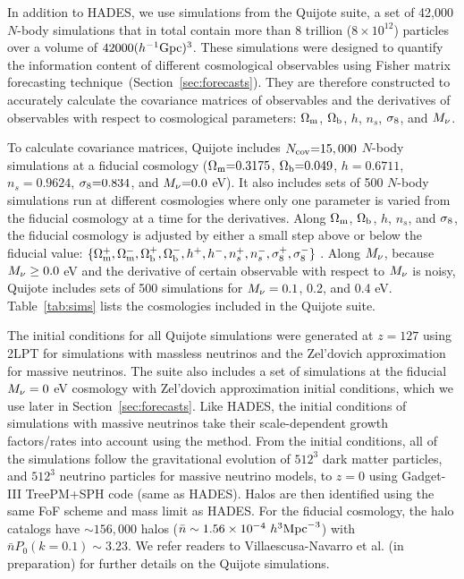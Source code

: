 In addition to HADES, we use simulations from the Quijote suite, a
set of 42,000 $N$-body simulations that in total contain more than 8 trillion 
($8\times10^{12}$) particles over a volume of $42000 (h^{-1}{\rm Gpc})^3$. 
These simulations were designed to quantify the information content of 
different cosmological observables using Fisher matrix forecasting 
technique~(Section~\ref{sec:forecasts}). They are therefore constructed to accurately 
calculate the covariance matrices of observables and the derivatives of observables with 
respect to cosmological parameters: 
$\Omega_{\rm m}$, $\Omega_{\rm b}$, $h$, $n_s$, $\sigma_8$, and $M_\nu$.

To calculate covariance matrices, Quijote includes $N_{\rm cov}{=}15,000$ $N$-body 
simulations at a fiducial cosmology ($\Omega_{\rm m}{=}0.3175$, $\Omega_{\rm b}{=}0.049$, $h{=}0.6711$, 
$n_s{=}0.9624$, $\sigma_8{=}0.834$, and $M_\nu{=}0.0$ eV). It also includes sets 
of 500 $N$-body simulations run at different cosmologies where only one parameter 
is varied from the fiducial cosmology at a time for the derivatives. Along $\Omega_{\rm m}$, 
$\Omega_{\rm b}$, $h$, $n_s$, and $\sigma_8$, the fiducial cosmology is adjusted by either a 
small step above or below the fiducial value: 
$\{\Omega_{\rm m}^{+}, \Omega_{\rm m}^{-}, \Omega_{\rm b}^{+}, \Omega_{\rm b}^{-}, h^+, h^-, n_s^{+}, n_s^{-}, \sigma_8^{+}, \sigma_8^-\}$ . 
Along $M_\nu$, because $M_\nu \ge 0.0$ eV and the derivative of certain observable 
with respect to $M_\nu$ is noisy, Quijote includes sets of 500 simulations for 
$M_\nu = 0.1$, 0.2, and 0.4 eV. Table~\ref{tab:sims} lists the cosmologies included 
in the Quijote suite. 

The initial conditions for all Quijote simulations were generated at $z=127$ using 
2LPT for simulations with massless neutrinos and the Zel’dovich approximation for 
massive neutrinos. The suite also includes a set of simulations at the fiducial 
$M_\nu = 0$ eV cosmology with Zel'dovich approximation initial conditions, which 
we use later in Section~\ref{sec:forecasts}. Like HADES, the initial conditions 
of simulations with massive neutrinos take their scale-dependent growth factors/rates 
into account using the \cite{zennaro2017a} method. From the initial conditions, all 
of the simulations follow the gravitational evolution of $512^3$ dark matter particles, 
and $512^3$ neutrino particles for massive neutrino models, to $z=0$ using {\sc Gadget-III}
TreePM+SPH code (same as HADES). Halos are then identified using the same FoF 
scheme and mass limit as HADES. For the fiducial cosmology, the halo catalogs 
have ${\sim}156,000$ halos ($\bar{n} \sim 1.56 \times 10^{-4}~h^3{\rm Mpc}^{-3}$) 
with $\bar{n} P_0(k=0.1)\sim 3.23$.
We refer readers to Villaescusa-Navarro et al. (in preparation) for further details 
on the Quijote simulations.

